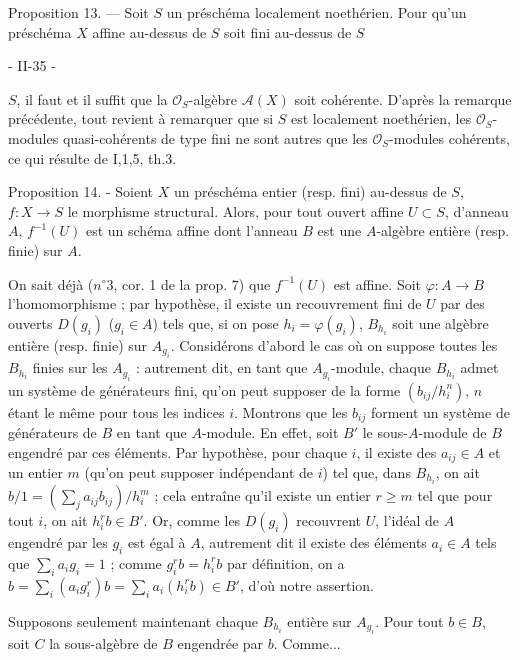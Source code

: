 Proposition 13. — Soit $S$ un préschéma localement noethérien. Pour qu'un préschéma $X$ affine au-dessus de $S$ soit fini au-dessus de $S$

\newpage


- II-35 -

$S$, il faut et il suffit que la $\mathcal{O}_S$-algèbre $\mathcal{A}(X)$ soit cohérente.
D'après la remarque précédente, tout revient à remarquer que si $S$ est localement noethérien, les $\mathcal{O}_S$-modules quasi-cohérents de type fini ne sont autres que les $\mathcal{O}_S$-modules cohérents, ce qui résulte de I,1,5, th.3.

Proposition 14. - Soient $X$ un préschéma entier (resp. fini) au-dessus de $S$, $f: X \to S$ le morphisme structural. Alors, pour tout ouvert affine $U \subset S$, d'anneau $A$, $f^{-1}(U)$ est un schéma affine dont l'anneau $B$ est une $A$-algèbre entière (resp. finie) sur $A$.

On sait déjà ($n^\circ 3$, cor. 1 de la prop. 7) que $f^{-1}(U)$ est affine. Soit $\varphi: A \to B$ l'homomorphisme ; par hypothèse, il existe un recouvrement fini de $U$ par des ouverts $D(g_i)$ ($g_i \in A$) tels que, si on pose $h_i = \varphi(g_i)$, $B_{h_i}$ soit une algèbre entière (resp. finie) sur $A_{g_i}$. Considérons d'abord le cas où on suppose toutes les $B_{h_i}$ finies sur les $A_{g_i}$ : autrement dit, en tant que $A_{g_i}$-module, chaque $B_{h_i}$ admet un système de générateurs fini, qu'on peut supposer de la forme $(b_{ij} / h_i^n)$, $n$ étant le même pour tous les indices $i$. Montrons que les $b_{ij}$ forment un système de générateurs de $B$ en tant que $A$-module. En effet, soit $B'$ le sous-$A$-module de $B$ engendré par ces éléments. Par hypothèse, pour chaque $i$, il existe des $a_{ij} \in A$ et un entier $m$ (qu'on peut supposer indépendant de $i$) tel que, dans $B_{h_i}$, on ait $b/1 = (\sum_j a_{ij} b_{ij}) / h_i^m$ ; cela entraîne qu'il existe un entier $r \geqslant m$ tel que pour tout $i$, on ait $h_i^r b \in B'$. Or, comme les $D(g_i)$ recouvrent $U$, l'idéal de $A$ engendré par les $g_i$ est égal à $A$, autrement dit il existe des éléments $a_i \in A$ tels que $\sum_i a_i g_i = 1$ ; comme $g_i^r b = h_i^r b$ par définition, on a $b = \sum_i (a_i g_i^r) b = \sum_i a_i (h_i^r b) \in B'$, d'où notre assertion.

Supposons seulement maintenant chaque $B_{h_i}$ entière sur $A_{g_i}$. Pour tout $b \in B$, soit $C$ la sous-algèbre de $B$ engendrée par $b$. Comme...

